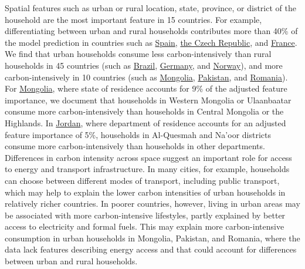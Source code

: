 \documentclass[12pt, a4paper]{article}
\begin{document}
Spatial features such as urban or rural location, state, province, or district of the household are the most important feature in 15 countries. For example, differentiating between urban and rural households contributes more than 40\% of the model prediction in countries such as \hyperref[fig:5b_ESP]{Spain}, \hyperref[fig:5b_CZE]{the Czech Republic}, and \hyperref[fig:5b_FRA]{France}. We find that urban households consume less carbon-intensively than rural households in 45 countries (such as \hyperref[fig:5b_BRA]{Brazil}, \hyperref[fig:5b_DEU]{Germany}, and \hyperref[fig:5b_NOR]{Norway}), and more carbon-intensively in 10 countries (such as \hyperref[fig:5b_MNG]{Mongolia}, \hyperref[fig:5b_PAK]{Pakistan}, and \hyperref[fig:5b_ROU]{Romania}). For \hyperref[fig:5b_MNG]{Mongolia}, where state of residence accounts for 9\% of the adjusted feature importance, we document that households in Western Mongolia or Ulaanbaatar consume more carbon-intensively than households in Central Mongolia or the Highlands. In \hyperref[fig:5b_JOR]{Jordan}, where department of residence accounts for an adjusted feature importance of 5\%, households in Al-Quesmah and Na'oor districts consume more carbon-intensively than households in other departments. Differences in carbon intensity across space suggest an important role for access to energy and transport infrastructure. In many cities, for example, households can choose between different modes of transport, including public transport, which may help to explain the lower carbon intensities of urban households in relatively richer countries. In poorer countries, however, living in urban areas may be associated with more carbon-intensive lifestyles, partly explained by better access to electricity and formal fuels. This may explain more carbon-intensive consumption in urban households in Mongolia, Pakistan, and Romania, where the data lack features describing energy access and that could account for differences between urban and rural households.
\end{document}
